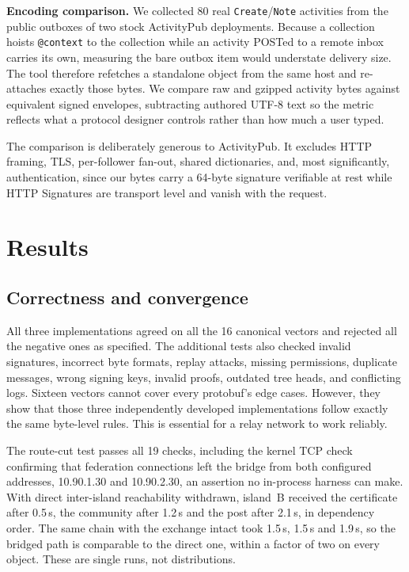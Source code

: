 \documentclass[conference,a4paper]{IEEEtran}
\begin{document}
\textbf{Encoding comparison.} We collected 80 real
\texttt{Create}/\texttt{Note} activities from the public outboxes of two stock ActivityPub \cite{activitypub} deployments. Because a collection hoists \texttt{@context} to the
collection while an activity POSTed to a remote inbox carries its own,
measuring the bare outbox item would understate delivery size. The tool
therefore refetches a standalone object from the same host and re-attaches
exactly those bytes. We compare raw and gzipped activity bytes against
equivalent signed envelopes, subtracting authored UTF-8 text so the metric
reflects what a protocol designer controls rather than how much a user typed.

The comparison is deliberately generous to ActivityPub. It excludes HTTP
framing, TLS, per-follower fan-out, shared dictionaries, and, most significantly, authentication, since our bytes carry a 64-byte signature
verifiable at rest while HTTP Signatures are transport level and vanish with
the request.

\section{Results}
\label{sec:results}

\subsection{Correctness and convergence}


All three implementations agreed on all the 16 canonical vectors and rejected all the negative ones as specified. The additional tests also checked invalid signatures, incorrect byte formats, replay attacks, missing permissions, duplicate messages, wrong signing keys, invalid proofs, outdated tree heads, and conflicting logs. Sixteen vectors cannot cover every protobuf's edge cases. However, they show that those three independently developed implementations follow exactly the same byte-level rules. This is essential for a relay network to work reliably.


The route-cut test passes all 19 checks, including the kernel TCP check confirming that federation connections left the bridge from both configured addresses, 10.90.1.30 and 10.90.2.30, an assertion no in-process harness can make. With direct inter-island reachability withdrawn, island~B received the certificate after 0.5\,s, the community after 1.2\,s and the post after 2.1\,s, in dependency order. The same chain with the exchange intact took 1.5\,s, 1.5\,s and 1.9\,s, so the bridged path is comparable to the direct one, within a factor of two on every object. These are single runs, not distributions.
\end{document}
